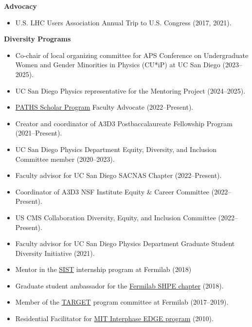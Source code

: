 \documentclass[11pt]{res}
\begin{document}
\begin{resume}
  \textbf{Advocacy}
  \begin{itemize}
    \itemsep-0.3em
    \item U.S. LHC Users Association Annual Trip to U.S. Congress ({2017, 2021}).
  \end{itemize}

  \textbf{Diversity Programs}
  \begin{itemize}
    \itemsep-0.3em
    \item Co-chair of local organizing committee for APS Conference on Undergraduate Women and Gender Minorities in Physics (CU*iP) at UC San Diego (2023--2025).
    \item UC San Diego Physics representative for the Mentoring Project (2024--2025).
    \item \href{https://paths.ucsd.edu/index.html}{PATHS Scholar Program} Faculty Advocate (2022--Present).
    \item Creator and coordinator of A3D3 Postbaccalaureate Fellowship Program (2021--Present).
    \item UC San Diego Physics Department Equity, Diversity, and Inclusion Committee member ({2020--2023}).
    \item Faculty advisor for UC San Diego SACNAS Chapter ({2022--Present}).
    \item Coordinator of A3D3 NSF Institute Equity \& Career Committee ({2022--Present}).
    \item US CMS Collaboration Diversity, Equity, and Inclusion Committee ({2022--Present}).
    \item Faculty advisor for UC San Diego Physics Department Graduate Student Diversity Initiative ({2021}).
    \item Mentor in the \href{http://diversity.fnal.gov/sist/}{SIST} internship program at Fermilab ({2018})
    \item Graduate student ambassador for the \href{http://diversity.fnal.gov/fshpe/}{Fermilab SHPE chapter} ({2018}).
    \item Member of the \href{http://diversity.fnal.gov/target/}{TARGET} program committee at Fermilab ({2017--2019}).
    \item Residential Facilitator for \href{http://ome.mit.edu/programs-services/program-overview}{MIT Interphase EDGE program} ({2010}).
  \end{itemize}



\end{resume}
\end{document}
